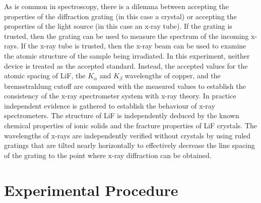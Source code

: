 \noindent As is common in spectroscopy, there is a dilemma between accepting the properties of the diffraction grating (in this case a crystal) or accepting the properties of the light source (in this case an x-ray tube). If the grating is trusted, then the grating can be used to measure the spectrum of the incoming x-rays. If the x-ray tube is trusted, then the x-ray beam can be used to examine the atomic structure of the sample being irradiated. In this experiment, neither device is treated as the accepted standard. Instead, the accepted values for the atomic spacing of LiF, the $K_{\alpha}$ and $K_{\beta}$ wavelengths of copper, and the bremsstrahlung cutoff are compared with the measured values to establish the consistency of the x-ray spectrometer system with x-ray theory. In practice independent evidence is gathered to establish the behaviour of x-ray spectrometers. The structure of LiF is independently deduced by the known chemical properties of ionic solids and the fracture properties of LiF crystals. The wavelengths of x-rays are independently verified without crystals by using ruled gratings that are tilted nearly horizontally to effectively decrease the line spacing of the grating to the point where x-ray diffraction can be obtained.

\section{Experimental Procedure}

